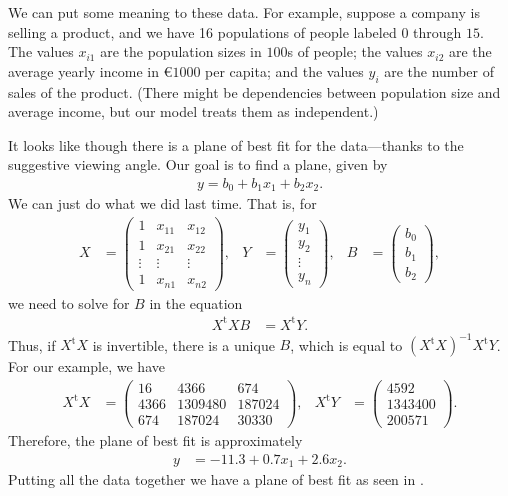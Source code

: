 \documentclass[a4paper, 12pt]{article}
\numberwithin{equation}{section}
\numberwithin{figure}{section}
\theoremstyle{definition}
\newcommand{\tr}{\mathrm{t}}
\begin{document}
We can put some meaning to these data. For example, suppose a company is selling
a product, and we have 16 populations of people labeled $0$ through $15$. The
values $x_{i1}$ are the population sizes in $100$s of people; the values
$x_{i2}$ are the average yearly income in €$1000$ per capita; and the values
$y_i$ are the number of sales of the product. (There might be dependencies
between population size and average income, but our model treats them as
independent.)

It looks like though there is a plane of best fit for the data---thanks to the
suggestive viewing angle. Our goal is to find a plane, given by 
\begin{align*} 
	y = b_0 + b_1x_1 + b_2x_2. 
\end{align*} 
We can just do what we did last time. That is, for 
\begin{align*}
	X &= \begin{pmatrix}
		1 & x_{11} & x_{12} \\ 
		1 & x_{21} & x_{22} \\
		\vdots & \vdots & \vdots \\
		1 & x_{n1} & x_{n2} 
	\end{pmatrix}, & 
	Y &= \begin{pmatrix}
		y_1 \\ y_2 \\ \vdots \\ y_n
	\end{pmatrix}, & 
	B &= \begin{pmatrix}
		b_0 \\ b_1 \\ b_2
	\end{pmatrix},
\end{align*}
we need to solve for $B$ in the equation
\begin{align*}
	X^{\tr} X B &= X^{\tr} Y .	
\end{align*}
Thus, if $X^{\tr}X$ is invertible, there is a unique $B$, which is equal to
$(X^{\tr}X)^{-1}X^{\tr}Y$. For our example, we have 
\begin{align*}
	X^{\tr}X &= \begin{pmatrix}
		16 &    4366 &     674 \\
		4366 & 1309480 &  187024 \\
		674 &  187024 &   30330
	\end{pmatrix}, & 
	X^{\tr}Y &= \begin{pmatrix}
		4592 \\
		1343400 \\
		200571
	\end{pmatrix}.
\end{align*}
Therefore, the plane of best fit is approximately
\begin{align*}
	y &= -11.3 + 0.7x_1 + 2.6x_2.
\end{align*}
Putting all the data together we have a plane of best fit as seen in
.
\end{document}
